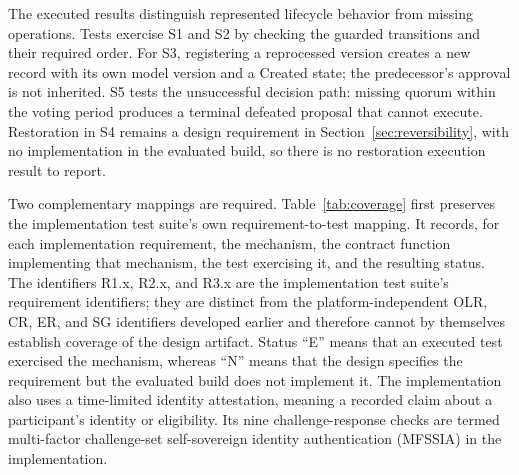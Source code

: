 \documentclass[journal]{IEEEtran}
\begin{document}
The executed results distinguish represented lifecycle behavior from
missing operations. Tests exercise S1 and S2 by checking the guarded
transitions and their required order. For S3, registering a reprocessed
version creates a new record with its own model version and a Created
state; the predecessor's approval is not inherited. S5 tests the
unsuccessful decision path: missing quorum within the voting period
produces a terminal defeated proposal that cannot execute.
Restoration in S4 remains a design requirement in
Section~\ref{sec:reversibility}, with no implementation in the evaluated
build, so there is no restoration execution result to report.

Two complementary mappings are required. Table~\ref{tab:coverage}
first preserves the implementation test suite's own requirement-to-test
mapping. It records, for each implementation requirement, the mechanism,
the contract function implementing that mechanism, the test
exercising it, and the resulting status. The identifiers R1.x, R2.x, and
R3.x are the implementation test suite's requirement identifiers; they are
distinct from the platform-independent OLR, CR, ER, and SG identifiers
developed earlier and therefore cannot by themselves establish coverage of
the design artifact. Status ``E'' means that an executed test exercised the
mechanism, whereas ``N'' means that the design specifies the requirement but
the evaluated build does not implement it. The implementation also uses a
time-limited identity attestation, meaning a recorded claim about a
participant's identity or eligibility. Its nine challenge-response checks
are termed multi-factor challenge-set self-sovereign identity authentication
(MFSSIA) in the implementation.
\end{document}
